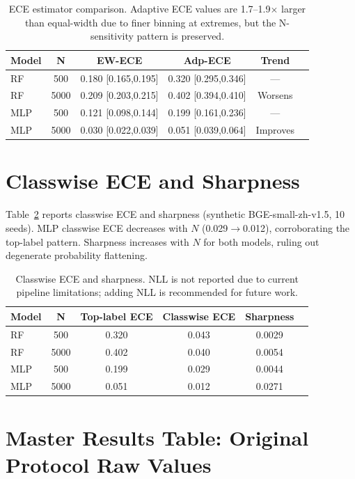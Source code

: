 \documentclass[11pt]{article}
\begin{document}
\begin{table}[H]
\centering
\caption{ECE estimator comparison. Adaptive ECE values are 1.7--1.9$\times$ larger than equal-width due to finer binning at extremes, but the N-sensitivity pattern is preserved.}
\label{tab:ece_comparison}
\footnotesize
\begin{tabular}{@{}lccccc@{}}
\toprule
\textbf{Model} & \textbf{N} & \textbf{EW-ECE} & \textbf{Adp-ECE} & \textbf{Trend} \\
\midrule
RF  & 500  & 0.180 [0.165,0.195] & 0.320 [0.295,0.346] & --- \\
RF  & 5000 & 0.209 [0.203,0.215] & 0.402 [0.394,0.410] & Worsens \\
MLP & 500  & 0.121 [0.098,0.144] & 0.199 [0.161,0.236] & --- \\
MLP & 5000 & 0.030 [0.022,0.039] & 0.051 [0.039,0.064] & Improves \\
\bottomrule
\end{tabular}
\end{table}

\section{Classwise ECE and Sharpness}

Table~\ref{tab:classwise} reports classwise ECE and sharpness (synthetic BGE-small-zh-v1.5, 10 seeds). MLP classwise ECE decreases with $N$ (0.029$\to$0.012), corroborating the top-label pattern. Sharpness increases with $N$ for both models, ruling out degenerate probability flattening.

\begin{table}[H]
\centering
\caption{Classwise ECE and sharpness. NLL is not reported due to current pipeline limitations; adding NLL is recommended for future work.}
\label{tab:classwise}
\begin{tabular}{@{}lccccc@{}}
\toprule
\textbf{Model} & \textbf{N} & \textbf{Top-label ECE} & \textbf{Classwise ECE} & \textbf{Sharpness} \\
\midrule
RF  & 500  & 0.320 & 0.043 & 0.0029 \\
RF  & 5000 & 0.402 & 0.040 & 0.0054 \\
MLP & 500  & 0.199 & 0.029 & 0.0044 \\
MLP & 5000 & 0.051 & 0.012 & 0.0271 \\
\bottomrule
\end{tabular}
\end{table}

\section{Master Results Table: Original Protocol Raw Values}
\end{document}
